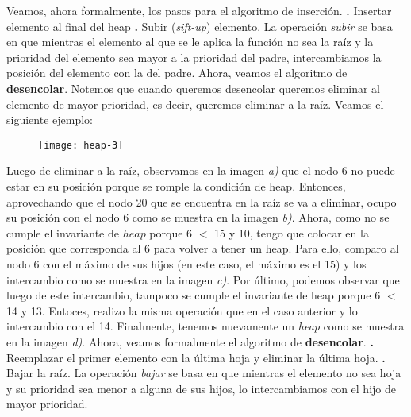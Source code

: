 \documentclass[10pt,a4paper]{article}
\begin{document}
\newline
\newline
Veamos, ahora formalmente, los pasos para el algoritmo de inserción.
\newline
\newline
\textbf{.} Insertar elemento al final del heap
\newline
\newline
\textbf{.} Subir (\textit{sift-up}) elemento. La operación \textit{subir} se basa en que mientras el elemento al que se le aplica la función no sea la raíz y la prioridad del elemento sea mayor a la prioridad del padre, intercambiamos la posición del elemento con la del padre.
\newline
\newline
Ahora, veamos el algoritmo de \textbf{desencolar}. Notemos que cuando queremos desencolar queremos eliminar al elemento de mayor prioridad, es decir, queremos eliminar a la raíz.
\newline
\newline
Veamos el siguiente ejemplo:
\newline
\begin{figure}[h]
	\centering
\texttt{[image: heap-3]}
	\label{drivers1}
\end{figure}
\newline
\newline
Luego de eliminar a la raíz, observamos en la imagen \textit{a)} que el nodo 6 no puede estar en su posición porque se romple la condición de heap.
\newline
\newline
Entonces, aprovechando que el nodo 20 que se encuentra en la raíz se va a eliminar, ocupo su posición con el nodo 6 como se muestra en la imagen \textit{b)}.
\newline
\newline
Ahora, como no se cumple el invariante de $heap$ porque 6 $<$ 15 y 10, tengo que colocar en la posición que corresponda al 6 para volver a tener un heap. Para ello, comparo al nodo 6 con el máximo de sus hijos (en este caso, el máximo es el 15) y los intercambio como se muestra en la imagen \textit{c)}.
\newline
\newline
Por último, podemos observar que luego de este intercambio, tampoco se cumple el invariante de heap porque 6 $<$ 14 y 13. Entoces, realizo la misma operación que en el caso anterior y lo intercambio con el 14. Finalmente, tenemos nuevamente un \textit{heap} como se muestra en la imagen \textit{d)}.
\newline
\newline
Ahora, veamos formalmente el algoritmo de \textbf{desencolar}.
\newline
\newline
\textbf{.} Reemplazar el primer elemento con la última hoja y eliminar la última hoja.
\newline
\newline
\textbf{.} Bajar la raíz. La operación \textit{bajar} se basa en que mientras el elemento no sea hoja y su prioridad sea menor a alguna de sus hijos, lo intercambiamos con el hijo de mayor prioridad.
\newpage
\end{document}
